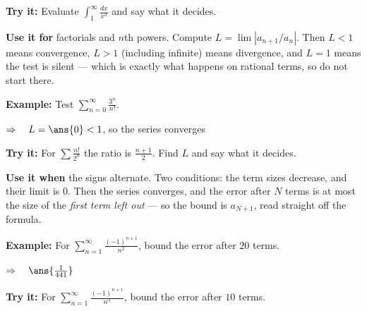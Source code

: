 \documentclass[12pt]{article}
\begin{document}
\begin{tryitbox}
\textbf{Try it:} \quad Evaluate $\displaystyle\int_1^{\infty}\frac{dx}{x^{3}}$ and say what it decides.\\[2pt]
\end{tryitbox}


\begin{formulabox}
\textbf{Use it for} factorials and $n$th powers. Compute $L = \lim |a_{n+1}/a_{n}|$. Then $L < 1$ means convergence, $L > 1$ (including infinite) means divergence, and $L = 1$ means the test is silent --- which is exactly what happens on rational terms, so do not start there.
\end{formulabox}

\begin{examplebox}
\textbf{Example:} \quad Test $\displaystyle\sum_{n=0}^{\infty}\frac{3^{n}}{n!}$.

$\Rightarrow\quad L = \ans{0} < 1$, so the series converges
\end{examplebox}

\begin{tryitbox}
\textbf{Try it:} \quad For $\displaystyle\sum\frac{n!}{2^{n}}$ the ratio is $\frac{n+1}{2}$. Find $L$ and say what it decides.\\[2pt]
\end{tryitbox}


\begin{formulabox}
\textbf{Use it when} the signs alternate. Two conditions: the term sizes decrease, and their limit is $0$. Then the series converges, and the error after $N$ terms is at most the size of the \emph{first term left out} --- so the bound is $a_{N+1}$, read straight off the formula.
\end{formulabox}

\begin{examplebox}
\textbf{Example:} \quad For $\displaystyle\sum_{n=1}^{\infty}\frac{(-1)^{n+1}}{n^{2}}$, bound the error after $20$ terms.

$\Rightarrow\quad \ans{\frac{1}{441}}$
\end{examplebox}

\begin{tryitbox}
\textbf{Try it:} \quad For $\displaystyle\sum_{n=1}^{\infty}\frac{(-1)^{n+1}}{n^{3}}$, bound the error after $10$ terms.\\[2pt]
\end{tryitbox}
\end{document}
